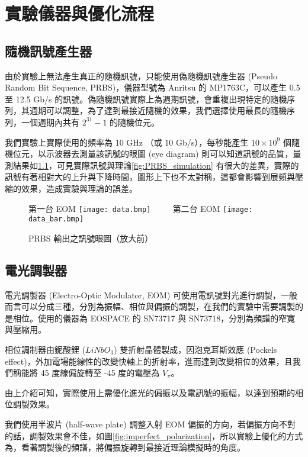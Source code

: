 \documentclass[class=NCU_thesis, crop=false]{standalone}
\begin{document}
\chapter{實驗儀器與優化流程}

\section{隨機訊號產生器}
由於實驗上無法產生真正的隨機訊號，只能使用偽隨機訊號產生器 (Pseudo Random Bit Sequence, PRBS)，儀器型號為 Anritsu 的 MP1763C，可以產生 0.5 至 12.5 Gb/s 的訊號。偽隨機訊號實際上為週期訊號，會重複出現特定的隨機序列，其週期可以調整，為了達到最接近隨機的效果，我們選擇使用最長的隨機序列，一個週期內共有 $2^{31}-1$ 的隨機位元。

我們實驗上實際使用的頻率為 10 GHz （或 10 Gb/s），每秒能產生 $10\times 10^{9}$ 個隨機位元，以示波器去測量該訊號的眼圖 (eye diagram) 則可以知道訊號的品質，量測結果如\cref{fig:prbs_eye}，可見實際訊號與理論\cref{fig:PRBS_simulation} 有很大的差異，實際的訊號有著相對大的上升與下降時間，圖形上下也不太對稱，這都會影響到展頻與壓縮的效果，造成實驗與理論的誤差。

\begin{figure}[!hbt]
    \centering
    \subcaptionbox
        {第一台 EOM
        \label{fig:subfig_fig1}}
        {\texttt{[image: data.bmp]}}
    ~~~~
    \subcaptionbox
        {第二台 EOM
        \label{fig:subfig_fig2}}
        {\texttt{[image: data\_bar.bmp]}}
    \caption{PRBS 輸出之訊號眼圖（放大前）}
    \label{fig:prbs_eye}
\end{figure}

\section{電光調製器}
電光調製器 (Electro-Optic Modulator, EOM) 可使用電訊號對光進行調製，一般而言可以分成三種，分別為振幅、相位與偏振的調製，在我們的實驗中需要調製的是相位。使用的儀器為 EOSPACE 的 SN73717 與 SN73718，分別為頻譜的窄寬與壓縮用。

相位調制器由鈮酸鋰 ($LiNbO_{3}$) 雙折射晶體製成，因泡克耳斯效應 (Pockels effect)，外加電場能線性的改變快軸上的折射率，進而達到改變相位的效果，且我們稱能將 45 度線偏旋轉至 -45 度的電壓為 $V_{\pi}$。

由上介紹可知，實際使用上需優化進光的偏振以及電訊號的振幅，以達到預期的相位調製效果。

我們使用半波片 (half-wave plate) 調整入射 EOM 偏振的方向，若偏振方向不對的話，調製效果會不佳，如圖\cref{fig:imperfect_polarization}，所以實驗上優化的方式為，看著調製後的頻譜，將偏振旋轉到最接近理論模擬時的角度。
\end{document}
